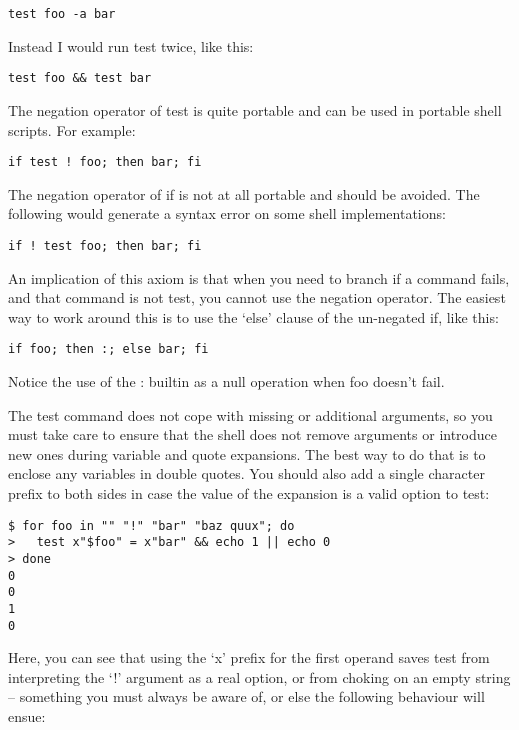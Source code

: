 \begin{Verbatim}[frame=single]
test foo -a bar
\end{Verbatim}

Instead I would run test twice, like this:

\begin{Verbatim}[frame=single]
test foo && test bar
\end{Verbatim}

The negation operator of test is quite portable and can be used in portable shell scripts. For example:

\begin{Verbatim}[frame=single]
if test ! foo; then bar; fi
\end{Verbatim}

The negation operator of if is not at all portable and should be avoided. The following would generate a syntax error on some shell implementations:

\begin{Verbatim}[frame=single]
if ! test foo; then bar; fi
\end{Verbatim}

An implication of this axiom is that when you need to branch if a command fails, and that command is not test, you cannot use the negation operator. The easiest way to work around this is to use the `else' clause of the un-negated if, like this:

\begin{Verbatim}[frame=single]
if foo; then :; else bar; fi
\end{Verbatim}

Notice the use of the : builtin as a null operation when foo doesn't fail.

The test command does not cope with missing or additional arguments, so you must take care to ensure that the shell does not remove arguments or introduce new ones during variable and quote expansions. The best way to do that is to enclose any variables in double quotes. You should also add a single character prefix to both sides in case the value of the expansion is a valid option to test: 

\begin{Verbatim}[frame=single]
$ for foo in "" "!" "bar" "baz quux"; do
>   test x"$foo" = x"bar" && echo 1 || echo 0
> done
0
0
1
0
\end{Verbatim}

Here, you can see that using the `x' prefix for the first operand saves test from interpreting the `!' argument as a real option, or from choking on an empty string -- something you must always be aware of, or else the following behaviour will ensue:

